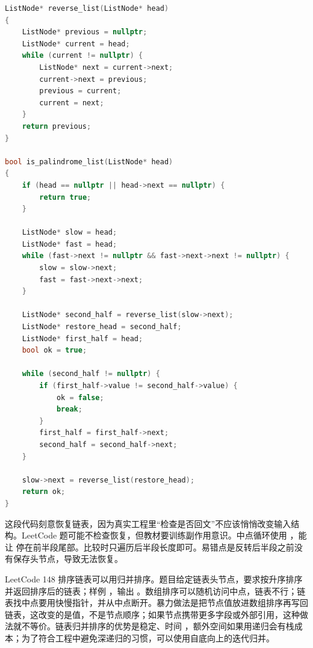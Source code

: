 \begin{lstlisting}[language=C++,caption={LeetCode 234 回文链表：反转后半段后比较}]
ListNode* reverse_list(ListNode* head)
{
    ListNode* previous = nullptr;
    ListNode* current = head;
    while (current != nullptr) {
        ListNode* next = current->next;
        current->next = previous;
        previous = current;
        current = next;
    }
    return previous;
}

bool is_palindrome_list(ListNode* head)
{
    if (head == nullptr || head->next == nullptr) {
        return true;
    }

    ListNode* slow = head;
    ListNode* fast = head;
    while (fast->next != nullptr && fast->next->next != nullptr) {
        slow = slow->next;
        fast = fast->next->next;
    }

    ListNode* second_half = reverse_list(slow->next);
    ListNode* restore_head = second_half;
    ListNode* first_half = head;
    bool ok = true;

    while (second_half != nullptr) {
        if (first_half->value != second_half->value) {
            ok = false;
            break;
        }
        first_half = first_half->next;
        second_half = second_half->next;
    }

    slow->next = reverse_list(restore_head);
    return ok;
}
\end{lstlisting}

这段代码刻意恢复链表，因为真实工程里“检查是否回文”不应该悄悄改变输入结构。LeetCode 题可能不检查恢复，但教材要训练副作用意识。中点循环使用 ，能让  停在前半段尾部。比较时只遍历后半段长度即可。易错点是反转后半段之前没有保存头节点，导致无法恢复。

LeetCode 148 排序链表可以用归并排序。题目给定链表头节点，要求按升序排序并返回排序后的链表；样例 ，输出 。数组排序可以随机访问中点，链表不行；链表找中点要用快慢指针，并从中点断开。暴力做法是把节点值放进数组排序再写回链表，这改变的是值，不是节点顺序；如果节点携带更多字段或外部引用，这种做法就不等价。链表归并排序的优势是稳定、时间 ，额外空间如果用递归会有栈成本；为了符合工程中避免深递归的习惯，可以使用自底向上的迭代归并。

